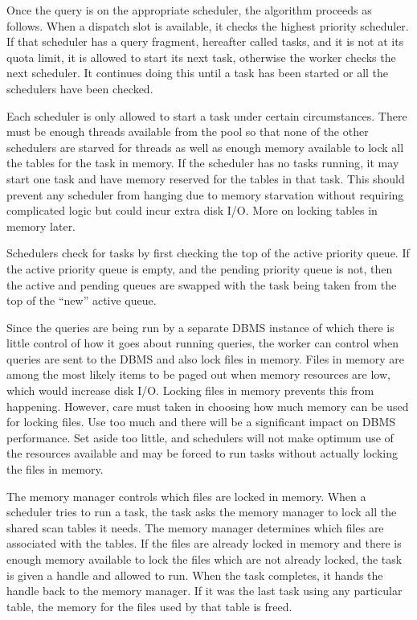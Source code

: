 \documentclass[DM,lsstdraft,toc]{lsstdoc}
\begin{document}
Once the query is on the appropriate scheduler, the algorithm proceeds
as follows. When a dispatch slot is available, it checks the highest
priority scheduler. If that scheduler has a query fragment, hereafter
called tasks, and it is not at its quota limit, it is allowed to start
its next task, otherwise the worker checks the next scheduler. It
continues doing this until a task has been started or all the schedulers
have been checked.

Each scheduler is only allowed to start a task under certain
circumstances. There must be enough threads available from the pool so
that none of the other schedulers are starved for threads as well as
enough memory available to lock all the tables for the task in memory.
If the scheduler has no tasks running, it may start one task and have
memory reserved for the tables in that task. This should prevent any
scheduler from hanging due to memory starvation without requiring
complicated logic but could incur extra disk I/O. More on locking tables
in memory later.

Schedulers check for tasks by first checking the top of the active
priority queue. If the active priority queue is empty, and the pending
priority queue is not, then the active and pending queues are swapped
with the task being taken from the top of the ``new'' active queue.

Since the queries are being run by a separate DBMS instance of which
there is little control of how it goes about running queries, the worker
can control when queries are sent to the DBMS and also lock files in
memory. Files in memory are among the most likely items to be paged out
when memory resources are low, which would increase disk I/O. Locking
files in memory prevents this from happening. However, care must taken
in choosing how much memory can be used for locking files. Use too much
and there will be a significant impact on DBMS performance. Set aside
too little, and schedulers will not make optimum use of the resources
available and may be forced to run tasks without actually locking the
files in memory.

The memory manager controls which files are locked in memory. When a
scheduler tries to run a task, the task asks the memory manager to lock
all the shared scan tables it needs. The memory manager determines which
files are associated with the tables. If the files are already locked in
memory and there is enough memory available to lock the files which are
not already locked, the task is given a handle and allowed to run. When
the task completes, it hands the handle back to the memory manager. If
it was the last task using any particular table, the memory for the
files used by that table is freed.
\end{document}
